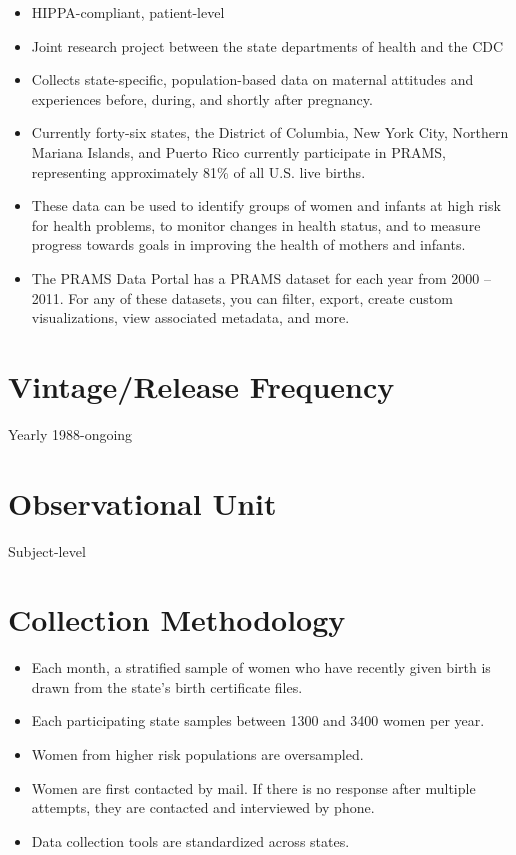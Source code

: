 \documentclass[
]{book}
\providecommand{\tightlist}{%
  \setlength{\itemsep}{0pt}\setlength{\parskip}{0pt}}
\begin{document}
\begin{itemize}
\tightlist
\item
  HIPPA-compliant, patient-level
\item
  Joint research project between the state departments of health and the CDC
\item
  Collects state-specific, population-based data on maternal attitudes and experiences before, during, and shortly after pregnancy.
\item
  Currently forty-six states, the District of Columbia, New York City, Northern Mariana Islands, and Puerto Rico currently participate in PRAMS, representing approximately 81\% of all U.S. live births.
\item
  These data can be used to identify groups of women and infants at high risk for health problems, to monitor changes in health status, and to measure progress towards goals in improving the health of mothers and infants.
\item
  The PRAMS Data Portal has a PRAMS dataset for each year from 2000 -- 2011. For any of these datasets, you can filter, export, create custom visualizations, view associated metadata, and more.
\end{itemize}

\hypertarget{vintagerelease-frequency-73}{%
\section{Vintage/Release Frequency}\label{vintagerelease-frequency-73}}

Yearly 1988-ongoing

\hypertarget{observational-unit-73}{%
\section{Observational Unit}\label{observational-unit-73}}

Subject-level

\hypertarget{collection-methodology-73}{%
\section{Collection Methodology}\label{collection-methodology-73}}

\begin{itemize}
\tightlist
\item
  Each month, a stratified sample of women who have recently given birth is drawn from the state's birth certificate files.
\item
  Each participating state samples between 1300 and 3400 women per year.
\item
  Women from higher risk populations are oversampled.
\item
  Women are first contacted by mail. If there is no response after multiple attempts, they are contacted and interviewed by phone.
\item
  Data collection tools are standardized across states.
\end{itemize}
\end{document}
